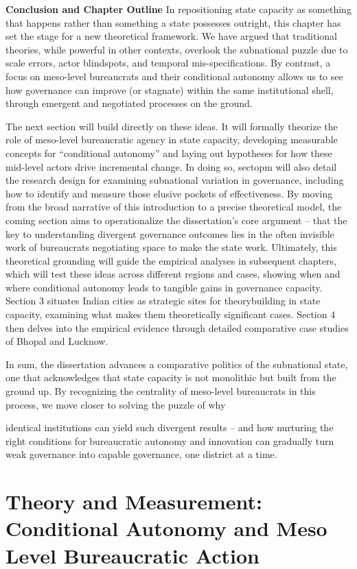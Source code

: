 \textbf{Conclusion and Chapter Outline}
In repositioning state capacity as something that happens rather than something a state possesses
outright, this chapter has set the stage for a new theoretical framework. We have argued that
traditional theories, while powerful in other contexts, overlook the subnational puzzle due to scale
errors, actor blindspots, and temporal mis-specifications. By contrast, a focus on meso-level
bureaucrats and their conditional autonomy allows us to see how governance can improve (or
stagnate) within the same institutional shell, through emergent and negotiated processes on the ground.

The next section will build directly on these ideas. It will formally theorize the role of meso-level
bureaucratic agency in state capacity, developing measurable concepts for “conditional autonomy” and
laying out hypotheses for how these mid-level actors drive incremental change. In doing so, sectopm
will also detail the research design for examining subnational variation in governance, including how
to identify and measure those elusive pockets of effectiveness. By moving from the broad narrative of
this introduction to a precise theoretical model, the coming section aims to operationalize the
dissertation’s core argument – that the key to understanding divergent governance outcomes lies in the
often invisible work of bureaucrats negotiating space to make the state work. Ultimately, this
theoretical grounding will guide the empirical analyses in subsequent chapters, which will test these
ideas across different regions and cases, showing when and where conditional autonomy leads to
tangible gains in governance capacity. Section 3 situates Indian cities as strategic sites for theorybuilding
in state capacity, examining what makes them theoretically significant cases. Section 4 then
delves into the empirical evidence through detailed comparative case studies of Bhopal and Lucknow.

In sum, the dissertation advances a comparative politics of the subnational state, one that
acknowledges that state capacity is not monolithic but built from the ground up. By recognizing the
centrality of meso-level bureaucrats in this process, we move closer to solving the puzzle of why

identical institutions can yield such divergent results – and how nurturing the right conditions for
bureaucratic autonomy and innovation can gradually turn weak governance into capable governance,
one district at a time.

\section{Theory and Measurement: Conditional Autonomy and
Meso Level Bureaucratic Action}

